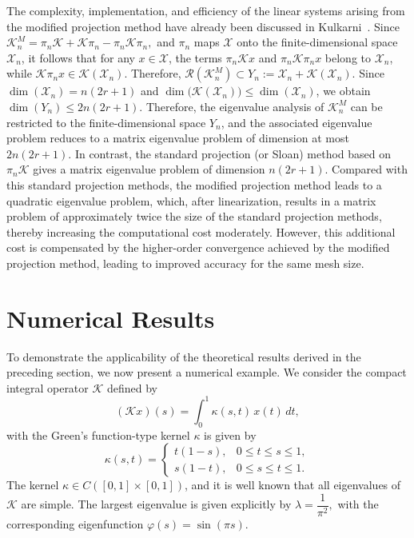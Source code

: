 \documentclass[pdflatex, sn-mathphys-num]{sn-jnl}%
\theoremstyle{thmstyleone}%
\theoremstyle{thmstyletwo}%
\theoremstyle{thmstylethree}%
\begin{document}
The complexity, implementation, and efficiency of the linear systems arising from the modified projection method have already been discussed in Kulkarni~\cite{RPK5,RPK6}.  Since \( \mathcal{K}_n^{M} = \pi_n \mathcal{K} + \mathcal{K}\pi_n - \pi_n \mathcal{K}\pi_n,\) and $\pi_n$ maps $\mathcal{X}$ onto the finite-dimensional space $\mathcal{X}_n$, it follows that for any  $x \in \mathcal{X}$, the terms $\pi_n\mathcal{K}x$ and  $\pi_n\mathcal{K}\pi_n x$ belong to $\mathcal{X}_n$, while  $\mathcal{K}\pi_n x \in \mathcal{K}(\mathcal{X}_n)$.  Therefore, $ \mathcal{R}(\mathcal{K}_n^{M}) \subset  Y_n := \mathcal{X}_n + \mathcal{K}(\mathcal{X}_n).$ Since $\dim(\mathcal{X}_n) = n(2r+1)$ and 
$\dim\big(\mathcal{K}(\mathcal{X}_n)\big)  \le \dim(\mathcal{X}_n)$, we obtain $\dim(Y_n) \le 2n(2r+1).$ Therefore, the eigenvalue analysis of $\mathcal{K}_n^{M}$ can be restricted to the finite-dimensional space $Y_n$, and the associated eigenvalue problem reduces to a matrix eigenvalue problem of dimension at most $2n(2r+1)$.  In contrast, the standard projection (or Sloan) method based on $\pi_n \mathcal{K}$ gives a matrix eigenvalue problem of dimension $n(2r+1)$. Compared with this standard projection methods, the modified projection method leads to a quadratic eigenvalue problem, which, after linearization, results in a matrix problem of approximately twice the size of the standard projection methods, thereby increasing the computational cost moderately. However, this additional cost is compensated by the higher-order convergence achieved by the modified projection method, leading to improved accuracy for the same mesh size.



\section{Numerical Results}
To demonstrate the applicability of the theoretical results derived in the preceding section, we now present a numerical example.  We consider the compact integral operator $\mathcal{K}$ defined by
\[
(\mathcal{K}x)(s)=\int_{0}^{1}\kappa(s,t)\,x(t)\,dt,
\]
with the Green's function-type kernel $\kappa$ is given by
\[
\kappa(s,t)=
\begin{cases}
	t(1-s), & 0\le t\le s\le 1,\\[1mm]
	s(1-t), & 0\le s\le t\le 1.
\end{cases}
\]
The kernel $\kappa\in C([0,1]\times[0,1])$, and it is well known that all eigenvalues of $\mathcal{K}$ are simple. The largest eigenvalue is given explicitly by $\lambda=\dfrac{1}{\pi^{2}},$ with the corresponding eigenfunction $\varphi(s)=\sin(\pi s)$.
\end{document}
